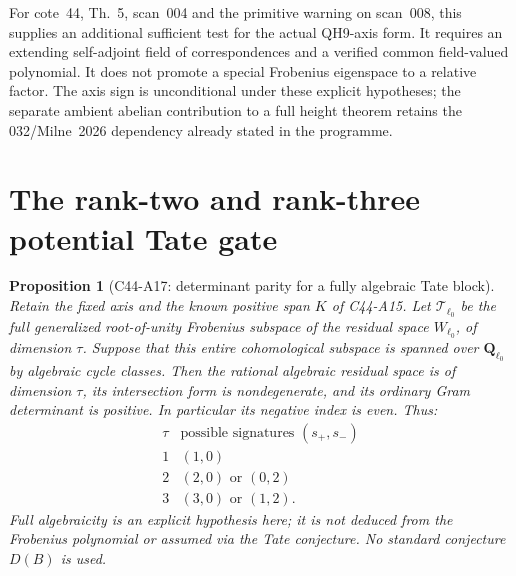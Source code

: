 \documentclass[11pt]{article}
\newtheorem{proposition}[theorem]{Proposition}
\theoremstyle{remark}\newtheorem{remark}[theorem]{Remark}
\begin{document}
For cote~44, Th.~5, scan~004 and the primitive warning on scan~008,
this supplies an additional sufficient test for the actual QH9-axis
form.  It requires an extending self-adjoint field of correspondences
and a verified common field-valued polynomial.  It does not promote
a special Frobenius eigenspace to a relative factor.  The axis sign
is unconditional under these explicit hypotheses; the separate
ambient abelian contribution to a full height theorem retains the
032/Milne~2026 dependency already stated in the programme.


\section{The rank-two and rank-three potential Tate gate}
\label{sec:c44-a17}

\begin{proposition}[C44-A17: determinant parity for a fully algebraic Tate block]
Retain the fixed axis and the known positive span $K$ of C44-A15.
Let $\mathcal T_{\ell_0}$ be the full generalized
root-of-unity Frobenius subspace of the residual space
$W_{\ell_0}$, of dimension $\tau$. Suppose that this
\emph{entire cohomological subspace} is spanned over
$\mathbf Q_{\ell_0}$ by algebraic cycle classes.
Then the rational algebraic residual space is of dimension
$\tau$, its intersection form is nondegenerate, and its
ordinary Gram determinant is positive. In particular its
negative index is even. Thus:
\[
\begin{array}{c|c}
 \tau&\text{possible signatures }(s_+,s_-)\\ \hline
 1&(1,0)\\
 2&(2,0)\text{ or }(0,2)\\
 3&(3,0)\text{ or }(1,2).
\end{array}
 \tag{A17.1}
\]
Full algebraicity is an explicit hypothesis here; it is
not deduced from the Frobenius polynomial or assumed via
the Tate conjecture. No standard conjecture $D(B)$ is used.
\end{proposition}
\end{document}
